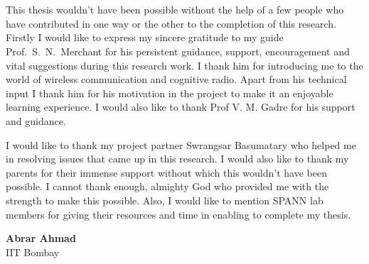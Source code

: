 \chapter*{}
This thesis wouldn't have been possible without the help of a few people who 
have contributed in one way or the other to the completion of this research.
Firstly I would like to express my sincere gratitude to my guide 
Prof.~S.~N.~Merchant for his persistent guidance, support, encouragement and
vital suggestions during this research work. I thank him for introducing me to
the world of wireless communication and cognitive radio. Apart from his
technical input I thank him for his motivation in the project to make it an
enjoyable learning experience. I would also like to thank Prof V. M. Gadre for
his support and guidance.

I would like to thank my project partner Swrangsar Basumatary who helped me in
resolving issues that came up in this research. I would also like to thank my
parents for their immense support without which this wouldn't have been
possible. I cannot thank enough, almighty God who provided me with the
strength to make this possible. Also, I would like to mention SPANN lab
members for giving their resources and time in enabling to complete my thesis.

\vspace{1.5cm}
\begin{flushright}
\textbf{Abrar Ahmad} \\
IIT Bombay
\end{flushright}